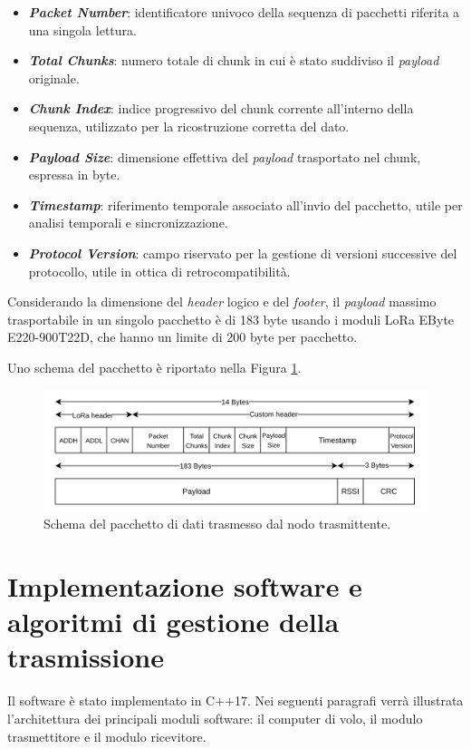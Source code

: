 \documentclass[12pt,a4paper,twoside]{book}
\begin{document}
\begin{itemize}
    \item \textbf{\emph{Packet Number}}: identificatore univoco della sequenza di pacchetti riferita a una singola lettura.
    \item \textbf{\emph{Total Chunks}}: numero totale di chunk in cui è stato suddiviso il \emph{payload} originale.
    \item \textbf{\emph{Chunk Index}}: indice progressivo del chunk corrente all'interno della sequenza, utilizzato per la ricostruzione corretta del dato.
    \item \textbf{\emph{Payload Size}}: dimensione effettiva del \emph{payload} trasportato nel chunk, espressa in byte.
    \item \textbf{\emph{Timestamp}}: riferimento temporale associato all’invio del pacchetto, utile per analisi temporali e sincronizzazione.
    \item \textbf{\emph{Protocol Version}}: campo riservato per la gestione di versioni successive del protocollo, utile in ottica di retrocompatibilità.
\end{itemize}

Considerando la dimensione del \emph{header} logico e del \emph{footer}, il \emph{payload} massimo trasportabile in un singolo pacchetto
è di 183 byte usando i moduli \ac{LoRa} EByte E220-900T22D, che hanno un limite di 200 byte per pacchetto.

Uno schema del pacchetto è riportato nella Figura \ref{fig:packet-schema}.
\begin{figure}[H]
    \centering
    \includegraphics[width=\textwidth]{img/protocol-packet.png}
    \caption{Schema del pacchetto di dati trasmesso dal nodo trasmittente.}
    \label{fig:packet-schema}
\end{figure}
\section{Implementazione software e algoritmi di gestione della trasmissione}
Il software è stato implementato in C++17. Nei seguenti paragrafi verrà illustrata
l'architettura dei principali moduli software: il computer di volo,
il modulo trasmettitore e il modulo ricevitore.
\end{document}
